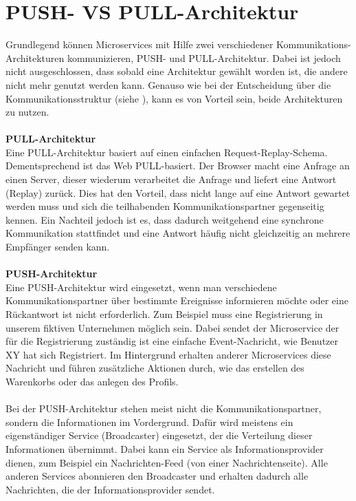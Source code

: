 \section{PUSH- VS PULL-Architektur}
\label{sec:PushPullArchitektur}
Grundlegend können Microservices mit Hilfe zwei verschiedener Kommunikations-Architekturen kommunizieren, PUSH- und PULL-Architektur. Dabei ist jedoch nicht ausgeschlossen, dass sobald eine Architektur gewählt worden ist, die andere nicht mehr genutzt werden kann. Genauso wie bei der Entscheidung über die Kommunikationsstruktur (siehe ), kann es von Vorteil sein, beide Architekturen zu nutzen.
\\\\
\textbf{PULL-Architektur}\\
Eine PULL-Architektur basiert auf einen einfachen Request-Replay-Schema. Dementsprechend ist das Web PULL-basiert.
Der Browser macht eine Anfrage an einen Server, dieser wiederum verarbeitet die Anfrage und liefert eine Antwort (Replay) zurück. Dies hat den Vorteil, dass nicht lange auf eine Antwort gewartet werden muss und sich die teilhabenden Kommunikationspartner gegenseitig kennen. Ein Nachteil jedoch ist es, dass dadurch weitgehend eine synchrone Kommunikation stattfindet und eine Antwort häufig nicht gleichzeitig an mehrere Empfänger senden kann.
\\\\
\textbf{PUSH-Architektur}\\
Eine PUSH-Architektur wird eingesetzt, wenn man verschiedene Kommunikationspartner über bestimmte Ereignisse informieren möchte oder eine Rückantwort ist nicht erforderlich. Zum Beispiel muss eine Registrierung in unserem fiktiven Unternehmen möglich sein. Dabei sendet der Microservice der für die Registrierung zuständig ist eine einfache Event-Nachricht, wie Benutzer XY hat sich Registriert. Im Hintergrund erhalten anderer Microservices diese Nachricht und führen zusätzliche Aktionen durch, wie das erstellen des Warenkorbs oder das anlegen des Profils.
\\\\
Bei der PUSH-Architektur stehen meist nicht die Kommunikationspartner, sondern die Informationen im Vordergrund. Dafür wird meistens ein eigenständiger Service (Broadcaster) eingesetzt, der die Verteilung dieser Informationen übernimmt. Dabei kann ein Service als Informationsprovider dienen, zum Beispiel ein Nachrichten-Feed (von einer Nachrichtenseite). Alle anderen Services abonnieren den Broadcaster und erhalten dadurch alle Nachrichten, die der Informationsprovider sendet.
